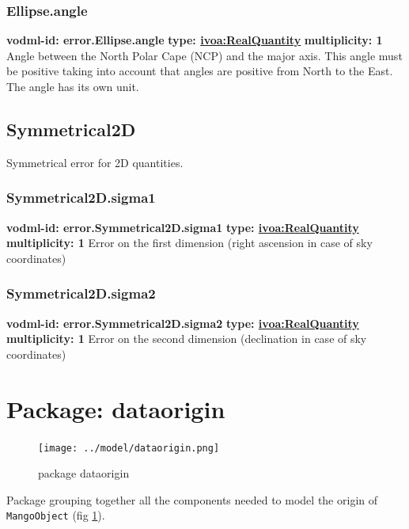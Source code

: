     \subsubsection{Ellipse.angle}
    \textbf{vodml-id: error.Ellipse.angle} \newline
    \textbf{type: \hyperref[sect:ivoa]{ivoa:RealQuantity}} \newline
    \textbf{multiplicity: 1} \newline
    Angle between the North Polar Cape (NCP) and the major axis. This angle must be positive taking into account that angles are positive from North to the East. The angle has its own unit.

  \subsection{Symmetrical2D}
    \label{sect:error.Symmetrical2D}
    Symmetrical error for 2D quantities.

    \subsubsection{Symmetrical2D.sigma1}
    \textbf{vodml-id: error.Symmetrical2D.sigma1} \newline
    \textbf{type: \hyperref[sect:ivoa]{ivoa:RealQuantity}} \newline
    \textbf{multiplicity: 1} \newline
    Error on the first dimension (right ascension in case of sky coordinates)

    \subsubsection{Symmetrical2D.sigma2}
    \textbf{vodml-id: error.Symmetrical2D.sigma2} \newline
    \textbf{type: \hyperref[sect:ivoa]{ivoa:RealQuantity}} \newline
    \textbf{multiplicity: 1} \newline
    Error on the second dimension (declination in case of sky coordinates)

\section{Package: dataorigin}
    \begin{figure}[h]
    \texttt{[image: ../model/dataorigin.png]}
    \caption{package dataorigin}
    \label{fig:dataorigin}
    \end{figure}
    Package grouping together all the components needed to model the origin of \texttt{MangoObject} (fig \ref{fig:dataorigin}).

